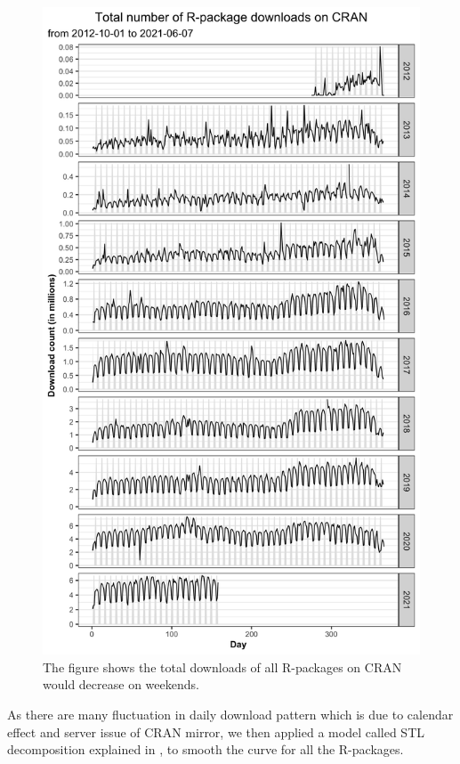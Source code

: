 \documentclass[
]{book}
\begin{document}
\begin{figure}

{\centering \includegraphics{figures/total-trend-1} 

}

\caption{The figure shows the total downloads of all R-packages on CRAN would decrease on weekends.}\label{fig:total-trend}
\end{figure}

As there are many fluctuation in daily download pattern which is due to calendar effect and server issue of CRAN mirror, we then applied a model called STL decomposition explained in \textcite{stl}, to smooth the curve for all the R-packages.
\end{document}

